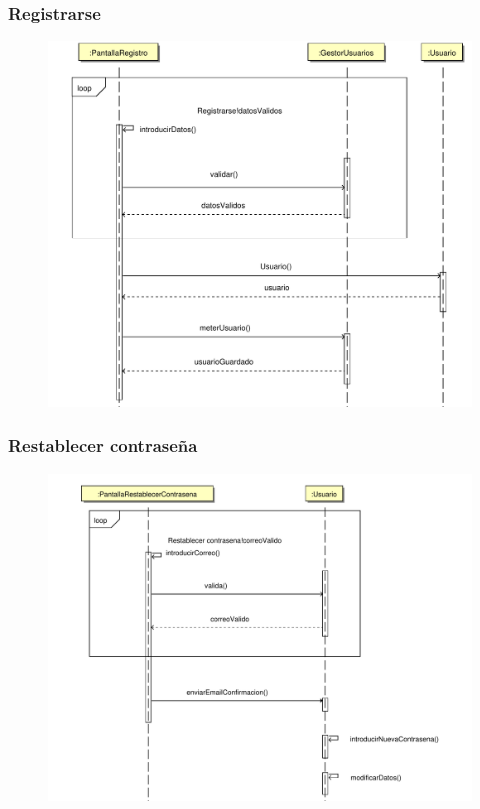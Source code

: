 \documentclass[11pt, a4paper, twoside, titlepage]{article}
\begin{document}
			\subsubsection{Registrarse}
				\begin{figure}[H]\centering
					\includegraphics[scale=.5]{diagramas/registrarse.pdf}
				\end{figure}

			\subsubsection{Restablecer contraseña}
				\begin{figure}[H]\centering
					\includegraphics[scale=.6]{diagramas/restablecercontrasena.pdf}
				\end{figure}
\end{document}
